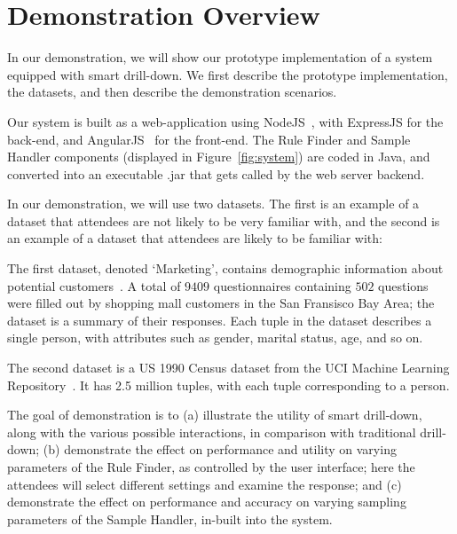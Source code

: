 \vspace{-10pt}
\section{Demonstration Overview} \label{sec:demo} 
In our demonstration, we will show our prototype implementation of a system equipped with smart drill-down. We first describe the prototype implementation, the datasets, and then describe the demonstration scenarios.

 Our system is built as a web-application using NodeJS~\cite{nodejs}, with ExpressJS for the back-end, and AngularJS~\cite{angular} for the front-end. The Rule Finder and Sample Handler components (displayed in Figure~\ref{fig:system}) are coded in Java, and converted into an executable .jar that gets called by the web server backend. 

 In our demonstration, we will use two datasets. The first is an example of a dataset that attendees are not likely to be very familiar with, and the second is an example of a dataset that attendees are likely to be familiar with:

The first dataset, denoted `Marketing', contains demographic information about potential customers~\cite{dataset1}. A total of $9409$ questionnaires containing $502$ questions were filled out by shopping mall customers in the San Fransisco Bay Area; the dataset is a summary of their responses. Each tuple in the dataset describes a single person, with attributes such as gender, marital status, age, and so on. 

The second dataset is a US 1990 Census dataset from the UCI Machine Learning Repository~\cite{uciml}. It has 2.5 million tuples, with each tuple corresponding to a person. %


 The goal of demonstration is to (a) illustrate
the utility of smart drill-down, along with the various possible interactions, 
in comparison with traditional drill-down; 
(b) demonstrate the effect on performance and utility on varying parameters of the Rule Finder, as controlled by the user interface; here the attendees will select different settings and examine the response; and
(c) demonstrate the effect on performance and accuracy on varying sampling parameters of the Sample Handler, in-built into the system.   

